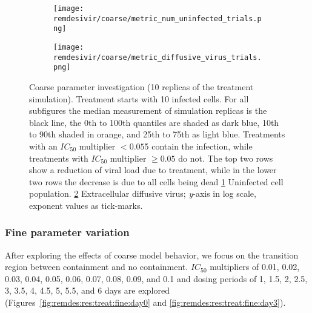 \begin{figure}[H]
\centering
\begin{subfigure}{0.8\textwidth}
\texttt{[image: remdesivir/coarse/metric\_num\_uninfected\_trials.png]}
\caption{}\label{fig:remdes:res:treat:coarse:uninf}
\end{subfigure}
\begin{subfigure}{0.8\textwidth}
\texttt{[image: remdesivir/coarse/metric\_diffusive\_virus\_trials.png]}
\caption{}\label{fig:remdes:res:treat:coarse:diff_vir}
\end{subfigure}
\caption{Coarse parameter investigation (10 replicas of the treatment simulation).  Treatment starts with 10 infected cells. For all subfigures the median measurement of simulation replicas is the black line, the 0th to 100th quantiles are shaded as dark blue, 10th to 90th shaded in orange, and 25th to 75th as light blue. Treatments with an $IC_{50}$ multiplier $<0.05$5 contain the infection, while treatments with $IC_{50}$ multiplier $\geq 0.05$ do not. The top two rows show a reduction of viral load due to treatment, while in the lower two rows the decrease is due to all cells being dead \ref{fig:remdes:res:treat:coarse:uninf} Uninfected cell population. \ref{fig:remdes:res:treat:coarse:diff_vir} Extracellular diffusive virus; \textit{y}-axis in log scale, exponent values as tick-marks.}\label{fig:remdes:res:treat:coarse}
\end{figure}


\subsubsection{Fine parameter variation}\label{sec:remdes:res:treat:fine}

 After exploring the effects of coarse model behavior, we focus on the transition region between containment and no containment. $IC_{50}$ multipliers of 0.01, 0.02, 0.03, 0.04, 0.05, 0.06, 0.07, 0.08, 0.09, and 0.1 and dosing periods of 1, 1.5, 2, 2.5, 3, 3.5, 4, 4.5, 5, 5.5, and 6 days are explored (Figures~\ref{fig:remdes:res:treat:fine:day0} and \ref{fig:remdes:res:treat:fine:day3}). 
 
